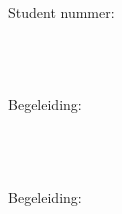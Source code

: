 
\begin{titlepage}

    \begin{addmargin}[-1cm]{-3cm}
        \begin{center}
            \large

            \hfill
            \vfill

            \begingroup
            \color[HTML]{27406B}\spacedallcaps{\myTitle} \\ \bigskip %

            \color[HTML]{84C6C8}\mySubtitle \\ \medskip
            \endgroup

            \spacedlowsmallcaps{\myName} \\
            Student nummer: \myStudentNr \\
            \myPhone



            \vfill


            \bigskip\bigskip

            \myUni \\
            \myFaculty \\
            \myDepartment \\
            Begeleiding: \myHvABegeleider \\ \bigskip \bigskip \bigskip
            \bigskip

            \myworkName \\
            \myworkAddress \\
            \myworkPostcodeCity \\
            Begeleiding: \myStagebegeleider \\

            \medskip
            \myTime

            \vfill

        \end{center}
    \end{addmargin}

\end{titlepage}
